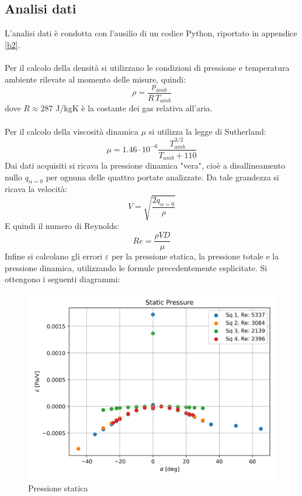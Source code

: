 \subsection{Analisi dati}
L'analisi dati è condotta con l'ausilio di un codice Python, riportato in appendice \ref{b2}.\\\\
Per il calcolo della densità si utilizzano le condizioni di pressione e temperatura ambiente rilevate al momento delle misure, quindi:
\begin{equation*}
    \rho = \frac{p_{amb}}{R\,T_{amb}}
\end{equation*}
dove $R\approx 287$ J/kgK è la costante dei gas relativa all'aria.\\\\
Per il calcolo della viscosità dinamica $\mu$ si utilizza la legge di Sutherland:
\begin{equation*}
    \mu = 1.46\cdot10^{-6} \frac{T_{amb}^{3/2}}{T_{amb}+110}
\end{equation*}
Dai dati acquisiti si ricava la pressione dinamica "vera", cioè a disallineamento nullo $q_{\alpha=0}$ per ognuna delle quattro portate analizzate. Da tale grandezza si ricava la velocità:
\begin{equation*}
    V = \sqrt{\frac{2q_{\alpha=0}}{\rho}}
\end{equation*}
E quindi il numero di Reynolds:
\begin{equation*}
    Re = \frac{\rho V D}{\mu}
\end{equation*}
Infine si calcolano gli errori $\varepsilon$ per la pressione statica, la pressione totale e la pressione dinamica, utilizzando le formule precedentemente esplicitate.
\newpage
\noindent Si ottengono i seguenti diagrammi:
\begin{figure}[h!]
    \centering
    \includegraphics[width=.76\textwidth]{images/2/p.png}
    \caption{Pressione statica}
\end{figure}
